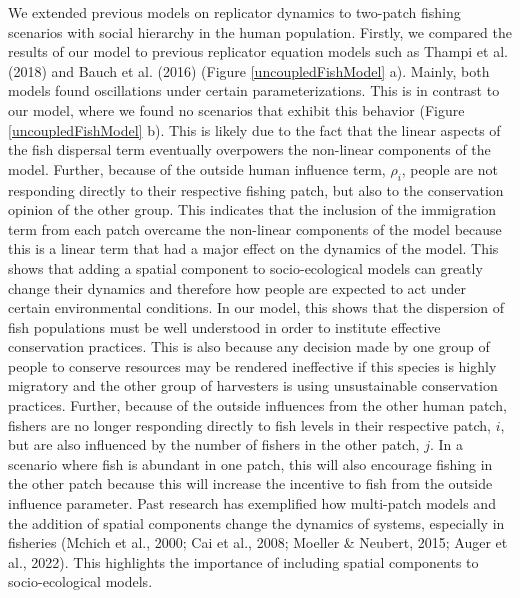 \documentclass[
]{article}
\begin{document}
We extended previous models on replicator dynamics to two-patch fishing scenarios with social hierarchy in the human population. Firstly, we compared the results of our model to previous replicator equation models such as Thampi et al. (2018) and Bauch et al. (2016) (Figure \ref{uncoupledFishModel} a). Mainly, both models found oscillations under certain parameterizations. This is in contrast to our model, where we found no scenarios that exhibit this behavior (Figure \ref{uncoupledFishModel} b). This is likely due to the fact that the linear aspects of the fish dispersal term eventually overpowers the non-linear components of the model. Further, because of the outside human influence term, \(\rho_i\), people are not responding directly to their respective fishing patch, but also to the conservation opinion of the other group. This indicates that the inclusion of the immigration term from each patch overcame the non-linear components of the model because this is a linear term that had a major effect on the dynamics of the model. This shows that adding a spatial component to socio-ecological models can greatly change their dynamics and therefore how people are expected to act under certain environmental conditions. In our model, this shows that the dispersion of fish populations must be well understood in order to institute effective conservation practices. This is also because any decision made by one group of people to conserve resources may be rendered ineffective if this species is highly migratory and the other group of harvesters is using unsustainable conservation practices. Further, because of the outside influences from the other human patch, fishers are no longer responding directly to fish levels in their respective patch, \(i\), but are also influenced by the number of fishers in the other patch, \(j\). In a scenario where fish is abundant in one patch, this will also encourage fishing in the other patch because this will increase the incentive to fish from the outside influence parameter. Past research has exemplified how multi-patch models and the addition of spatial components change the dynamics of systems, especially in fisheries (Mchich et al., 2000; Cai et al., 2008; Moeller \& Neubert, 2015; Auger et al., 2022). This highlights the importance of including spatial components to socio-ecological models.
\end{document}
